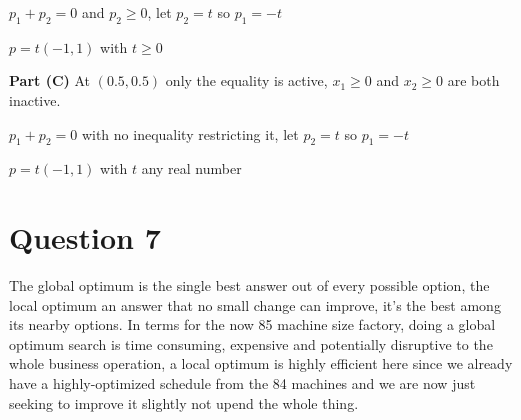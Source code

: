 \documentclass{article}
\begin{document}
$p_1 + p_2 = 0$ and $p_2 \ge 0$, let $p_2 = t$ so $p_1 = -t$

$p = t(-1,1)$ with $t \ge 0$

\textbf{Part (C)} At $(0.5,0.5)$ only the equality is active, $x_1 \ge 0$ and $x_2 \ge 0$ are both inactive.

$p_1 + p_2 = 0$ with no inequality restricting it, let $p_2 = t$ so $p_1 = -t$

$p = t(-1,1)$ with $t$ any real number

\section*{Question 7}
The global optimum is the single best answer out of every possible option, the local optimum an answer that no small change can improve, it's the best among its nearby options. In terms for the now 85 machine size factory, doing a global optimum search is time consuming, expensive and potentially disruptive to the whole business operation, a local optimum is highly efficient here since we already have a highly-optimized schedule from the 84 machines and we are now just seeking to improve it slightly not upend the whole thing.
\end{document}
